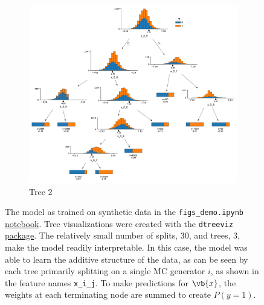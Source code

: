 \begin{landscape}
\begin{figure}[H]
\begin{subfigure}[b]{0.32\linewidth}
      \includegraphics[width=\textwidth]{figures/ml/figs_demo/dtreeviz_figs_2}
  \caption{Tree 2}
  \label{fig:FIGS:demo_trees:tree2}
  \end{subfigure}
\caption{
The \figs model as trained on synthetic data in the
\texttt{figs\_demo.ipynb} \href{https://github.com/mepland/data_science_notes/blob/main/plots/figs_demo.ipynb}{notebook}.
Tree visualizations were created with the \texttt{dtreeviz} \href{https://github.com/parrt/dtreeviz}{package}.
The relatively small number of splits, \num{30}, and trees, \num{3}, make the \figs model readily interpretable.
In this case, the \figs model was able to learn the additive structure of the data,
as can be seen by each tree primarily splitting on a single MC generator $i$,
as shown in the feature names \texttt{x\_i\_j}.
To make predictions for $\vb{x}$, the weights at each terminating node are summed to create $P\left(y=1\right)$.
\label{fig:FIGS:demo_trees}
}
\end{figure}
\end{landscape}

\newpage

